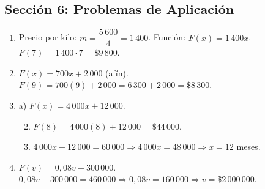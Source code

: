 \documentclass[12pt, letterpaper]{article}
\begin{document}
  \newpage

  \subsection*{Sección 6: Problemas de Aplicación}

  \begin{enumerate}[leftmargin=*, label=\textbf{\arabic*.}]
    \item Precio por kilo: $m = \dfrac{5\,600}{4} = 1\,400$. Función: $F(x) = 1\,400x$.
          $F(7) = 1\,400 \cdot 7 = \$9\,800$.

    \item $F(x) = 700x + 2\,000$ (afín). \quad $F(9) = 700(9) + 2\,000 = 6\,300 + 2\,000 = \$8\,300$.

    \item a) $F(x) = 4\,000x + 12\,000$.
          \begin{enumerate}[label=\alph*)]
            \setcounter{enumii}{1}
            \item $F(8) = 4\,000(8) + 12\,000 = \$44\,000$.
            \item $4\,000x + 12\,000 = 60\,000 \Rightarrow 4\,000x = 48\,000 \Rightarrow x = 12$ meses.
          \end{enumerate}

    \item $F(v) = 0{,}08v + 300\,000$. \quad $0{,}08v + 300\,000 = 460\,000 \Rightarrow 0{,}08v = 160\,000 \Rightarrow v = \$2\,000\,000$.
  \end{enumerate}

\fi
\end{document}
